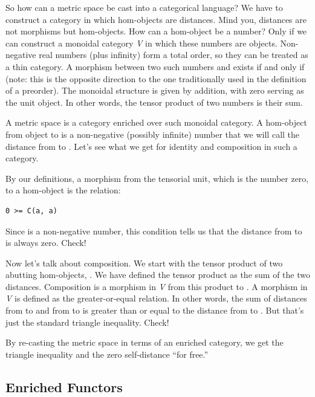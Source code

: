 So how can a metric space be cast into a categorical language? We have
to construct a category in which hom-objects are distances. Mind you,
distances are not morphisms but hom-objects. How can a hom-object be a
number? Only if we can construct a monoidal category \emph{V} in which
these numbers are objects. Non-negative real numbers (plus infinity)
form a total order, so they can be treated as a thin category. A
morphism between two such numbers  and  exists if
and only if  (note: this is the opposite
direction to the one traditionally used in the definition of a
preorder). The monoidal structure is given by addition, with zero
serving as the unit object. In other words, the tensor product of two
numbers is their sum.

A metric space is a category enriched over such monoidal category. A
hom-object  from object  to  is a
non-negative (possibly infinite) number that we will call the distance
from  to . Let's see what we get for identity and
composition in such a category.

By our definitions, a morphism from the tensorial unit, which is the
number zero, to a hom-object  is the relation:

\begin{verbatim}
0 >= C(a, a)
\end{verbatim}

Since  is a non-negative number, this condition tells
us that the distance from  to  is always zero.
Check!

Now let's talk about composition. We start with the tensor product of
two abutting hom-objects, . We have defined
the tensor product as the sum of the two distances. Composition is a
morphism in \emph{V} from this product to . A morphism
in \emph{V} is defined as the greater-or-equal relation. In other words,
the sum of distances from  to  and from 
to  is greater than or equal to the distance from 
to . But that's just the standard triangle inequality. Check!

By re-casting the metric space in terms of an enriched category, we get
the triangle inequality and the zero self-distance ``for free.''

\subsection{Enriched Functors}\label{enriched-functors}

